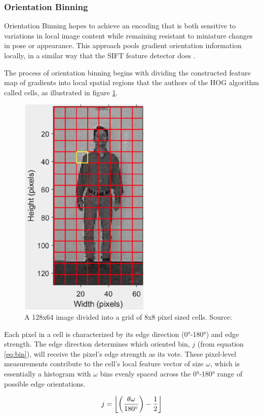 \subsubsection{Orientation Binning}

Orientation Binning hopes to achieve an encoding that is both sensitive to variations in local image content while remaining resistant to miniature changes in pose or appearance. This approach pools gradient orientation information locally, in a similar way that the SIFT feature detector does \cite{lowe_2004_distinctive}.

The process of orientation binning begins with dividing the constructed feature map of gradients into local spatial regions that the authors of the HOG algorithm called cells, as illustrated in figure \ref{fig:cells}.

\begin{figure}
    \centering
    \includegraphics[width=0.3\linewidth]{images/cells.png}
    \caption{A 128x64 image divided into a grid of 8x8 pixel sized cells. Source: \cite{shidlovskiy_2020_reducing}}
    \label{fig:cells}
\end{figure}

Each pixel in a cell is characterized by its edge direction (0°-180°) and edge strength. The edge direction determines which oriented bin, $j$ (from equation \ref{eq:bin}), will receive the pixel's edge strength as its vote. These pixel-level measurements contribute to the cell's local feature vector of size $\omega$, which is essentially a histogram with $\omega$ bins evenly spaced across the 0°-180° range of possible edge orientations.

\begin{equation}
    \label{eq:bin}
    j = \left\lfloor  \left( \frac{\theta \omega}{180 \degree} \right) - \frac{1}{2}  \right\rfloor 
\end{equation}

